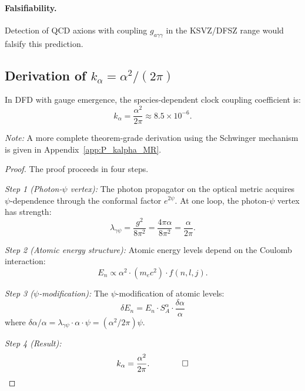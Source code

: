\paragraph{Falsifiability.}
Detection of QCD axions with coupling $g_{a\gamma\gamma}$ in the KSVZ/DFSZ range would falsify this prediction.

\subsection{Derivation of $k_\alpha = \alpha^2/(2\pi)$}\label{app:kalpha-derivation}

\begin{theorem}\label{thm:kalpha}
In DFD with gauge emergence, the species-dependent clock coupling coefficient is:
\begin{equation}
k_\alpha = \frac{\alpha^2}{2\pi} \approx 8.5 \times 10^{-6}.
\end{equation}
\end{theorem}

\noindent\textit{Note:} A more complete theorem-grade derivation using the Schwinger mechanism is given in Appendix~\ref{app:P_kalpha_MR}.

\begin{proof}
The proof proceeds in four steps.

\textit{Step 1 (Photon-$\psi$ vertex):} The photon propagator on the optical metric acquires $\psi$-dependence through the conformal factor $e^{2\psi}$. At one loop, the photon-$\psi$ vertex has strength:
\begin{equation}
\lambda_{\gamma\psi} = \frac{g^2}{8\pi^2} = \frac{4\pi\alpha}{8\pi^2} = \frac{\alpha}{2\pi}.
\end{equation}

\textit{Step 2 (Atomic energy structure):} Atomic energy levels depend on the Coulomb interaction:
\begin{equation}
E_n \propto \alpha^2 \cdot (m_e c^2) \cdot f(n, l, j).
\end{equation}

\textit{Step 3 ($\psi$-modification):} The $\psi$-modification of atomic levels:
\begin{equation}
\delta E_n = E_n \cdot S_A^\alpha \cdot \frac{\delta\alpha}{\alpha}
\end{equation}
where $\delta\alpha/\alpha = \lambda_{\gamma\psi} \cdot \alpha \cdot \psi = (\alpha^2/2\pi)\psi$.

\textit{Step 4 (Result):}
\begin{equation}
k_\alpha = \frac{\alpha^2}{2\pi}. \qquad \qed
\end{equation}
\end{proof}

